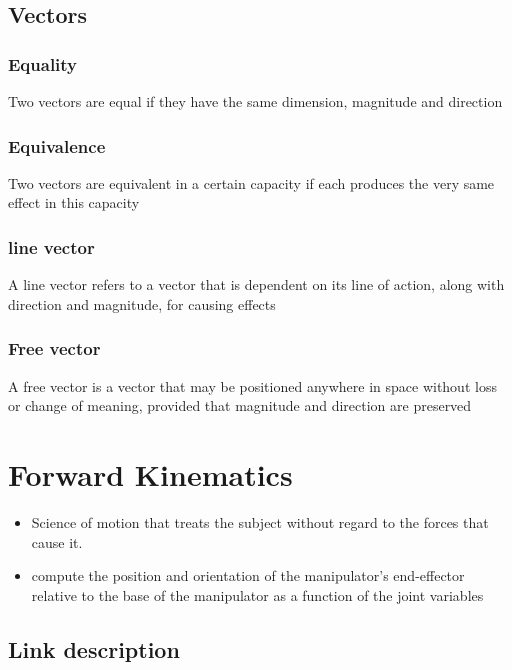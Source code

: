 \documentclass[10pt,a4paper]{article}
\begin{document}
\subsection{Vectors}
\subsubsection{Equality}
Two vectors are equal if they have the same dimension, magnitude and direction

\subsubsection{Equivalence}
Two vectors are equivalent in a certain capacity if each produces the very same effect in this capacity

\subsubsection{line vector}
A line vector refers to a vector that is dependent on its line of action, along with direction and magnitude, for causing effects

\subsubsection{Free vector}
A free vector is a vector that may be positioned anywhere in space without loss or change of meaning, provided that magnitude and direction are preserved

\section{Forward Kinematics}
\begin{itemize}
	\item Science of motion that treats the subject without regard to the forces that cause it.
	\item compute the position and orientation of the manipulator's end-effector relative to the base of the manipulator as a function of the joint variables
\end{itemize}

\subsection{Link description}
\end{document}

